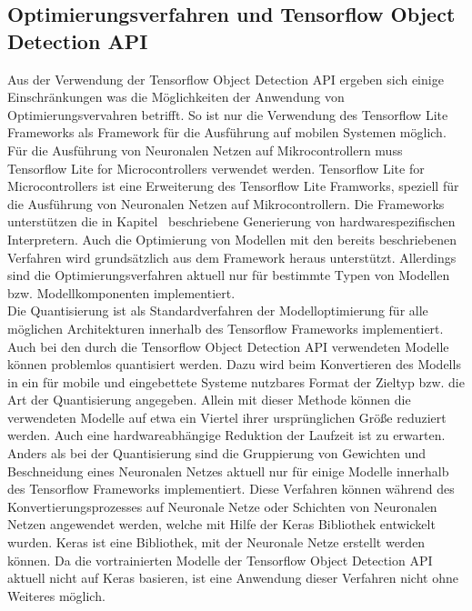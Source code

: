 \subsection{Optimierungsverfahren und Tensorflow Object Detection API}
    Aus der Verwendung der Tensorflow Object Detection API ergeben sich einige Einschränkungen was die Möglichkeiten der Anwendung von Optimierungsvervahren betrifft. So ist nur die Verwendung des Tensorflow Lite Frameworks als Framework für die Ausführung auf mobilen Systemen möglich. Für die Ausführung von Neuronalen Netzen auf Mikrocontrollern muss Tensorflow Lite for Microcontrollers verwendet werden. Tensorflow Lite for Microcontrollers ist eine Erweiterung des Tensorflow Lite Framworks, speziell für die Ausführung von Neuronalen Netzen auf Mikrocontrollern. Die Frameworks unterstützen die in Kapitel~ beschriebene Generierung von hardwarespezifischen Interpretern. Auch die Optimierung von Modellen mit den bereits beschriebenen Verfahren wird grundsätzlich aus dem Framework heraus unterstützt. Allerdings sind die Optimierungsverfahren aktuell nur für bestimmte Typen von Modellen bzw. Modellkomponenten implementiert\cite{TFMO}.\\ Die Quantisierung ist als Standardverfahren der Modelloptimierung für alle möglichen Architekturen innerhalb des Tensorflow Frameworks implementiert. Auch bei den durch die Tensorflow Object Detection API verwendeten Modelle können problemlos quantisiert werden. Dazu wird beim Konvertieren des Modells in ein für mobile und eingebettete Systeme nutzbares Format der Zieltyp bzw. die Art der Quantisierung angegeben. Allein mit dieser Methode können die verwendeten Modelle auf etwa ein Viertel ihrer ursprünglichen Größe reduziert werden. Auch eine hardwareabhängige Reduktion der Laufzeit ist zu erwarten\cite{TFMO}.\\ Anders als bei der Quantisierung sind die Gruppierung von Gewichten und Beschneidung eines Neuronalen Netzes aktuell nur für einige Modelle innerhalb des Tensorflow Frameworks implementiert. Diese Verfahren können während des Konvertierungsprozesses auf Neuronale Netze oder Schichten von Neuronalen Netzen angewendet werden, welche mit Hilfe der Keras Bibliothek entwickelt wurden. Keras ist eine Bibliothek, mit der Neuronale Netze erstellt werden können. Da die vortrainierten Modelle der Tensorflow Object Detection API aktuell nicht auf Keras basieren, ist eine Anwendung dieser Verfahren nicht ohne Weiteres möglich\cite{TFPrune}\cite{TFCluster}.  

